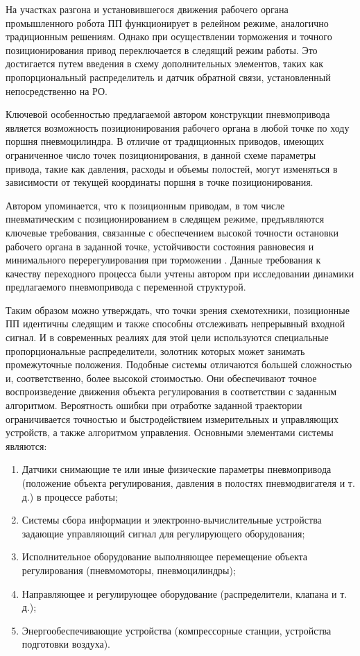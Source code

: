 На участках разгона и установившегося движения рабочего органа промышленного робота
ПП функционирует в релейном режиме, аналогично традиционным решениям.
Однако при осуществлении торможения и точного позиционирования привод переключается в
следящий режим работы. Это достигается путем введения в схему дополнительных элементов,
таких как пропорциональный распределитель и датчик обратной связи, установленный непосредственно
на РО.

Ключевой особенностью предлагаемой автором конструкции пневмопривода является возможность
позиционирования рабочего органа в любой точке по ходу поршня пневмоцилиндра. В отличие от
традиционных приводов, имеющих ограниченное число точек позиционирования, в данной схеме параметры
привода, такие как давления, расходы и объемы полостей, могут изменяться в зависимости от текущей
координаты поршня в точке позиционирования.

Автором упоминается, что к позиционным приводам, в том числе пневматическим с
позиционированием в следящем режиме, предъявляются ключевые требования, связанные с
обеспечением высокой точности остановки рабочего органа в заданной точке, устойчивости
состояния равновесия и минимального перерегулирования при торможении \cite*{shortnikov:a}.
Данные требования
к качеству переходного процесса были учтены автором при исследовании динамики предлагаемого
пневмопривода с переменной структурой.

Таким образом можно утверждать, что точки зрения схемотехники, позиционные ПП идентичны следящим
и также способны отслеживать непрерывный входной сигнал.
И в современных реалиях для этой цели используются специальные пропорциональные распределители, золотник которых
может занимать промежуточные положения. Подобные системы отличаются большей сложностью и,
соответственно, более высокой стоимостью. Они обеспечивают точное воспроизведение движения
объекта регулирования в соответствии с заданным алгоритмом. Вероятность ошибки при отработке
заданной траектории ограничивается точностью и быстродействием измерительных и управляющих
устройств, а также алгоритмом управления. Основными элементами системы являются:

\begin{enumerate}
    \item Датчики снимающие те или иные физические параметры пневмопривода
          (положение объекта регулирования, давления в полостях пневмодвигателя и т. д.) в процессе работы;
    \item Системы сбора информации и электронно-вычислительные устройства задающие управляющий сигнал для
          регулирующего оборудования;
    \item Исполнительное оборудование выполняющее перемещение объекта регулирования (пневмомоторы, пневмоцилиндры);
    \item Направляющее и регулирующее оборудование (распределители, клапана и т. д.);
    \item Энергообеспечивающие устройства (компрессорные станции, устройства подготовки воздуха).
\end{enumerate}

